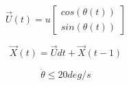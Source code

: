 \documentclass[conf]{new-aiaa}
\begin{document}
\begin{equation}
\label{eq:uavVelocity}
\overrightarrow{U}(t) = u \begin{bmatrix}
cos(\theta(t)) \\
sin(\theta(t))
\end{bmatrix}
\end{equation}


\begin{equation}
\label{eq:uavPosition}
\overrightarrow{X}(t) = \overrightarrow{U}dt + \overrightarrow{X}(t-1)
\end{equation}


\begin{equation}
\label{turnRate}
\dot{\theta} \leq 20 deg/s
\end{equation}


%
%
%
%
%
%
\end{document}
